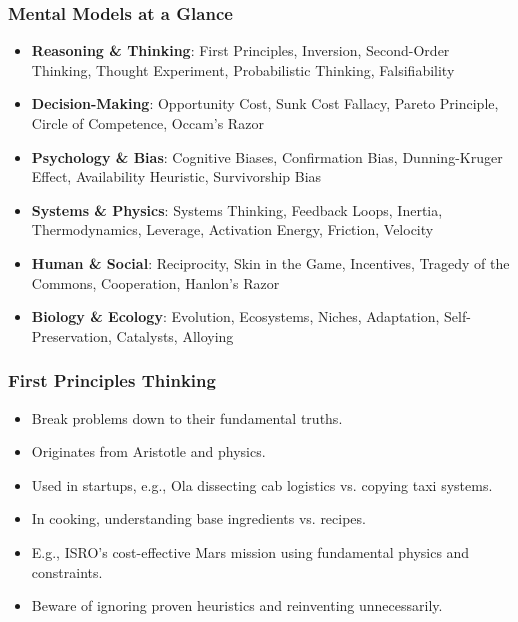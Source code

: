 \begin{frame}[fragile]\frametitle{Mental Models at a Glance}
  \begin{itemize}
    \item \textbf{Reasoning \& Thinking}: First Principles, Inversion, Second-Order Thinking, Thought Experiment, Probabilistic Thinking, Falsifiability
    \item \textbf{Decision-Making}: Opportunity Cost, Sunk Cost Fallacy, Pareto Principle, Circle of Competence, Occam's Razor
    \item \textbf{Psychology \& Bias}: Cognitive Biases, Confirmation Bias, Dunning-Kruger Effect, Availability Heuristic, Survivorship Bias
    \item \textbf{Systems \& Physics}: Systems Thinking, Feedback Loops, Inertia, Thermodynamics, Leverage, Activation Energy, Friction, Velocity
    \item \textbf{Human \& Social}: Reciprocity, Skin in the Game, Incentives, Tragedy of the Commons, Cooperation, Hanlon's Razor
    \item \textbf{Biology \& Ecology}: Evolution, Ecosystems, Niches, Adaptation, Self-Preservation, Catalysts, Alloying
  \end{itemize}
\end{frame}

\begin{frame}[fragile]\frametitle{First Principles Thinking}
  \begin{itemize}
    \item Break problems down to their fundamental truths.
    \item Originates from Aristotle and physics.
    \item Used in startups, e.g., Ola dissecting cab logistics vs. copying taxi systems.
    \item In cooking, understanding base ingredients vs. recipes.
    \item E.g., ISRO's cost-effective Mars mission using fundamental physics and constraints.
    \item Beware of ignoring proven heuristics and reinventing unnecessarily.
  \end{itemize}
  
	
\end{frame}

